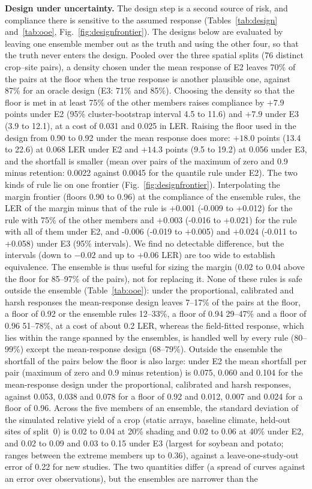\textbf{Design under uncertainty.} The design step is a second source of risk, and compliance there is sensitive to the assumed response (Tables~\ref{tab:design} and~\ref{tab:ooe}, Fig.~\ref{fig:designfrontier}). The designs below are evaluated by leaving one ensemble member out as the truth and using the other four, so that the truth never enters the design. Pooled over the three spatial splits (76 distinct crop--site pairs), a density chosen under the mean response of E2 leaves 70\% of the pairs at the floor when the true response is another plausible one, against 87\% for an oracle design (E3: 71\% and 85\%). Choosing the density so that the floor is met in at least 75\% of the other members raises compliance by $+7.9$ points under E2 (95\% cluster-bootstrap interval 4.5 to 11.6) and $+7.9$ under E3 (3.9 to 12.1), at a cost of 0.031 and 0.025 in LER. Raising the floor used in the design from 0.90 to 0.92 under the mean response does more: $+18.0$ points (13.4 to 22.6) at 0.068 LER under E2 and $+14.3$ points (9.5 to 19.2) at 0.056 under E3, and the shortfall is smaller (mean over pairs of the maximum of zero and 0.9 minus retention: 0.0022 against 0.0045 for the quantile rule under E2). The two kinds of rule lie on one frontier (Fig.~\ref{fig:designfrontier}). Interpolating the margin frontier (floors 0.90 to 0.96) at the compliance of the ensemble rules, the LER of the margin minus that of the rule is +0.001 (-0.009 to +0.012) for the rule with 75\% of the other members and +0.003 (-0.016 to +0.021) for the rule with all of them under E2, and -0.006 (-0.019 to +0.005) and +0.024 (-0.011 to +0.058) under E3 (95\% intervals). We find no detectable difference, but the intervals (down to $-0.02$ and up to $+0.06$ LER) are too wide to establish equivalence. The ensemble is thus useful for sizing the margin (0.02 to 0.04 above the floor for 85--97\% of the pairs), not for replacing it. None of these rules is safe outside the ensemble (Table~\ref{tab:ooe}): under the proportional, calibrated and harsh responses the mean-response design leaves 7--17\% of the pairs at the floor, a floor of 0.92 or the ensemble rules 12--33\%, a floor of 0.94 29--47\% and a floor of 0.96 51--78\%, at a cost of about 0.2 LER, whereas the field-fitted response, which lies within the range spanned by the ensembles, is handled well by every rule (80--99\%) except the mean-response design (68--79\%). Outside the ensemble the shortfall of the pairs below the floor is also large: under E2 the mean shortfall per pair (maximum of zero and 0.9 minus retention) is 0.075, 0.060 and 0.104 for the mean-response design under the proportional, calibrated and harsh responses, against 0.053, 0.038 and 0.078 for a floor of 0.92 and 0.012, 0.007 and 0.024 for a floor of 0.96. Across the five members of an ensemble, the standard deviation of the simulated relative yield of a crop (static arrays, baseline climate, held-out sites of split~0) is 0.02 to 0.04 at 20\% shading and 0.02 to 0.06 at 40\% under E2, and 0.02 to 0.09 and 0.03 to 0.15 under E3 (largest for soybean and potato; ranges between the extreme members up to 0.36), against a leave-one-study-out error of 0.22 for new studies. The two quantities differ (a spread of curves against an error over observations), but the ensembles are narrower than the 